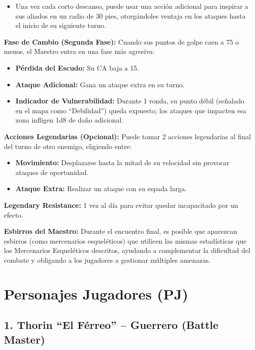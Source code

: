 \documentclass[
  twocolumn]{article}
\providecommand{\tightlist}{%
  \setlength{\itemsep}{0pt}\setlength{\parskip}{0pt}}
\begin{document}
\begin{itemize}
\tightlist
\item
  Una vez cada corto descanso, puede usar una acción adicional para
  inspirar a sus aliados en un radio de 30 pies, otorgándoles ventaja en
  los ataques hasta el inicio de su siguiente turno.
\end{itemize}

\textbf{Fase de Cambio (Segunda Fase):} Cuando sus puntos de golpe caen
a 75 o menos, el Maestro entra en una fase más agresiva:

\begin{itemize}
\tightlist
\item
  \textbf{Pérdida del Escudo:} Su CA baja a 15.
\item
  \textbf{Ataque Adicional:} Gana un ataque extra en su turno.
\item
  \textbf{Indicador de Vulnerabilidad:} Durante 1 ronda, su punto débil
  (señalado en el mapa como ``Debilidad'') queda expuesto; los ataques
  que impacten esa zona infligen 1d8 de daño adicional.
\end{itemize}

\textbf{Acciones Legendarias (Opcional):} Puede tomar 2 acciones
legendarias al final del turno de otro enemigo, eligiendo entre:

\begin{itemize}
\tightlist
\item
  \textbf{Movimiento:} Desplazarse hasta la mitad de su velocidad sin
  provocar ataques de oportunidad.
\item
  \textbf{Ataque Extra:} Realizar un ataque con su espada larga.
\end{itemize}

\textbf{Legendary Resistance:} 1 vez al día para evitar quedar
incapacitado por un efecto.

\textbf{Esbirros del Maestro:} Durante el encuentro final, es posible
que aparezcan esbirros (como mercenarios esqueléticos) que utilicen las
mismas estadísticas que los Mercenarios Esqueléticos descritos, ayudando
a complementar la dificultad del combate y obligando a los jugadores a
gestionar múltiples amenazas.

\section{Personajes Jugadores (PJ)}\label{personajes-jugadores-pj}

\subsection{1. Thorin ``El Férreo'' -- Guerrero (Battle
Master)}\label{thorin-el-fuxe9rreo-guerrero-battle-master}
\end{document}

